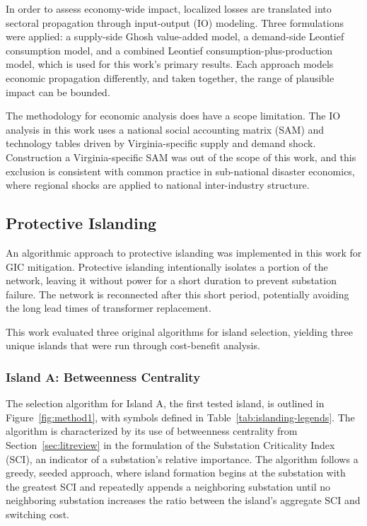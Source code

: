 \documentclass[draft]{agujournal2019}
\begin{document}
In order to assess economy-wide impact, localized losses are translated into sectoral propagation through input-output (IO) modeling. Three formulations were applied: a supply-side Ghosh value-added model, a demand-side Leontief consumption model, and a combined Leontief consumption-plus-production model, which is used for this work's primary results. Each approach models economic propagation differently, and taken together, the range of plausible impact can be bounded. 

The methodology for economic analysis does have a scope limitation. The IO analysis in this work uses a national social accounting matrix (SAM) and technology tables driven by Virginia-specific supply and demand shock. Construction a Virginia-specific SAM was out of the scope of this work, and this exclusion is consistent with common practice in sub-national disaster economics, where regional shocks are applied to national inter-industry structure.

\subsection{Protective Islanding}

An algorithmic approach to protective islanding was implemented in this work for GIC mitigation. Protective islanding intentionally isolates a portion of the network, leaving it without power for a short duration to prevent substation failure. The network is reconnected after this short period, potentially avoiding the long lead times of transformer replacement. 

This work evaluated three original algorithms for island selection, yielding three unique islands that were run through cost-benefit analysis. 

\subsubsection{Island A: Betweenness Centrality}\label{sec:methodA}

The selection algorithm for Island A, the first tested island, is outlined in Figure~\ref{fig:method1}, with symbols defined in Table~\ref{tab:islanding-legends}. The algorithm is characterized by its use of betweenness centrality from Section~\ref{sec:litreview} in the formulation of the Substation Criticality Index (SCI), an indicator of a substation's relative importance. The algorithm follows a greedy, seeded approach, where island formation begins at the substation with the greatest SCI and repeatedly appends a neighboring substation until no neighboring substation increases the ratio between the island's aggregate SCI and switching cost. 
\end{document}
